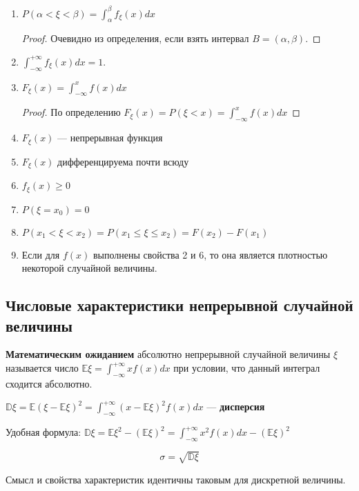 \begin{prop}\itemfix
    \begin{enumerate}
        \item \(P(\alpha < \xi < \beta) = \int_\alpha^\beta f_\xi(x) dx\)
              \begin{proof}
                  Очевидно из определения, если взять интервал \(B = (\alpha, \beta)\).
              \end{proof}

        \item \(\int_{ -\infty}^{+\infty} f_\xi(x)dx = 1\).
        \item \(F_\xi(x) = \int_{ - \infty}^x f(x) dx\)
              \begin{proof}
                  По определению \(F_\xi(x) = P(\xi < x) = \int_{ -\infty}^x f(x) dx\)
              \end{proof}
        \item \(F_\xi(x)\) --- непрерывная функция
        \item \(F_\xi(x)\) дифференцируема почти всюду
        \item \(f_\xi(x) \geq 0\)
        \item \(P(\xi = x_0) = 0\)
        \item \(P(x_1 < \xi < x_2) = P(x_1 \leq \xi \leq x_2) = F(x_2) - F(x_1)\)
        \item Если для \(f(x)\) выполнены свойства 2 и 6, то она является плотностью некоторой случайной величины.
    \end{enumerate}
\end{prop}

\subsection{Числовые характеристики непрерывной случайной величины}

\begin{definition}
    \textbf{Математическим ожиданием} абсолютно непрерывной случайной величины \(\xi\) называется число \(\mathbb{E}\xi = \int_{ -\infty}^{+\infty} x f(x) dx\) при условии, что данный интеграл сходится абсолютно.
\end{definition}

\begin{definition}
    \(\mathbb{D}\xi = \mathbb{E}(\xi - \mathbb{E}\xi)^2 = \int_{ -\infty}^{+\infty} (x - \mathbb{E}\xi)^2 f(x) dx\) --- \textbf{дисперсия}
\end{definition}

\begin{remark}
    Удобная формула: \(\mathbb{D}\xi = \mathbb{E}\xi^2 - (\mathbb{E}\xi)^2 = \int_{ -\infty}^{+\infty} x^2 f(x) dx - (\mathbb{E}\xi)^2\)
\end{remark}

\[\sigma = \sqrt{\mathbb{D}\xi}\]

\begin{remark}
    Смысл и свойства характеристик идентичны таковым для дискретной величины.
\end{remark}